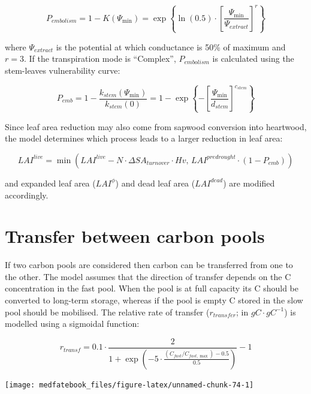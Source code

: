 \documentclass[]{book}
\begin{document}
\begin{equation}
P_{embolism}=1- K(\Psi_{\min}) = \exp \left \{\ln{(0.5)}\cdot \left[ \frac{\Psi_{\min}}{\Psi_{extract}} \right] ^r \right \} 
\end{equation}

where \(\Psi_{extract}\) is the potential at which conductance is 50\%
of maximum and \(r=3\). If the transpiration mode is ``Complex'',
\(P_{embolism}\) is calculated using the stem-leaves vulnerability
curve:

\begin{equation}
P_{emb}= 1- \frac{k_{stem}(\Psi_{\min})}{k_{stem}(0)} = 1 - \exp \left \{-\left[ \frac{\Psi_{\min}}{d_{stem}} \right] ^{c_{stem}} \right \} 
\end{equation}

Since leaf area reduction may also come from sapwood conversion into
heartwood, the model determines which process leads to a larger
reduction in leaf area:

\begin{equation}
LAI^{live} = \min(LAI^{live} - N \cdot \Delta SA_{turnover} \cdot Hv , \, LAI^{predrought} \cdot (1 - P_{emb}))
\end{equation}

and expanded leaf area (\(LAI^{\phi}\)) and dead leaf area
(\(LAI^{dead}\)) are modified accordingly.

\section{Transfer between carbon
pools}\label{transfer-between-carbon-pools}

If two carbon pools are considered then carbon can be transferred from
one to the other. The model assumes that the direction of transfer
depends on the C concentration in the fast pool. When the pool is at
full capacity its C should be converted to long-term storage, whereas if
the pool is empty C stored in the slow pool should be mobilised. The
relative rate of transfer (\(r_{transfer}\); in \(g C·g C^{-1}\)) is
modelled using a sigmoidal function:

\begin{equation}
r_{transf} = 0.1 \cdot \frac{2}{1+\exp \left(-5 \cdot \frac{(C_{fast}/C_{fast, \max})-0.5}{0.5}\right)}-1
\end{equation}

\begin{center}\texttt{[image: medfatebook\_files/figure-latex/unnamed-chunk-74-1]} \end{center}
\end{document}
